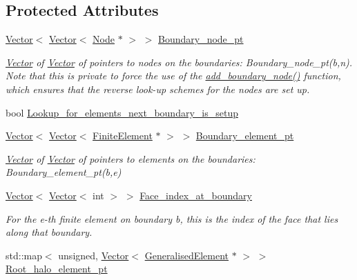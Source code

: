 \subsection*{Protected Attributes}
\begin{DoxyCompactItemize}
\item 
\hyperlink{classoomph_1_1Vector}{Vector}$<$ \hyperlink{classoomph_1_1Vector}{Vector}$<$ \hyperlink{classoomph_1_1Node}{Node} $\ast$ $>$ $>$ \hyperlink{classoomph_1_1Mesh_abbba08d3de5cccd78ee98afc7b2f61fc}{Boundary\+\_\+node\+\_\+pt}
\begin{DoxyCompactList}\small\item\em \hyperlink{classoomph_1_1Vector}{Vector} of \hyperlink{classoomph_1_1Vector}{Vector} of pointers to nodes on the boundaries\+: Boundary\+\_\+node\+\_\+pt(b,n). Note that this is private to force the use of the \hyperlink{classoomph_1_1Mesh_a007b102ac8e42328872ad658d7110bfc}{add\+\_\+boundary\+\_\+node()} function, which ensures that the reverse look-\/up schemes for the nodes are set up. \end{DoxyCompactList}\item 
bool \hyperlink{classoomph_1_1Mesh_a37f6d27447f643a74694012b09350ce9}{Lookup\+\_\+for\+\_\+elements\+\_\+next\+\_\+boundary\+\_\+is\+\_\+setup}
\item 
\hyperlink{classoomph_1_1Vector}{Vector}$<$ \hyperlink{classoomph_1_1Vector}{Vector}$<$ \hyperlink{classoomph_1_1FiniteElement}{Finite\+Element} $\ast$ $>$ $>$ \hyperlink{classoomph_1_1Mesh_a266ac14a3e884f978c8605f7b5786e81}{Boundary\+\_\+element\+\_\+pt}
\begin{DoxyCompactList}\small\item\em \hyperlink{classoomph_1_1Vector}{Vector} of \hyperlink{classoomph_1_1Vector}{Vector} of pointers to elements on the boundaries\+: Boundary\+\_\+element\+\_\+pt(b,e) \end{DoxyCompactList}\item 
\hyperlink{classoomph_1_1Vector}{Vector}$<$ \hyperlink{classoomph_1_1Vector}{Vector}$<$ int $>$ $>$ \hyperlink{classoomph_1_1Mesh_a62adbe45fe65ff9cd329bb45d197347c}{Face\+\_\+index\+\_\+at\+\_\+boundary}
\begin{DoxyCompactList}\small\item\em For the e-\/th finite element on boundary b, this is the index of the face that lies along that boundary. \end{DoxyCompactList}\item 
std\+::map$<$ unsigned, \hyperlink{classoomph_1_1Vector}{Vector}$<$ \hyperlink{classoomph_1_1GeneralisedElement}{Generalised\+Element} $\ast$ $>$ $>$ \hyperlink{classoomph_1_1Mesh_a6e01d05056ce7e2d38eb66a7af8d9174}{Root\+\_\+halo\+\_\+element\+\_\+pt}

\end{DoxyCompactItemize}
